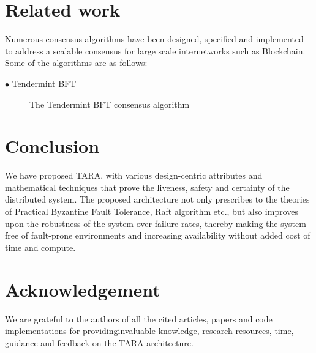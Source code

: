 \documentclass[]{article}
\begin{document}
\section{Related work}
Numerous consensus algorithms have been designed, specified and implemented to address a scalable consensus for large scale internetworks such as Blockchain. Some of the algorithms are as follows:
\begin{description}
	\item[$\bullet$ Tendermint BFT] The Tendermint BFT consensus algorithm
\end{description}

\section{Conclusion}
We have proposed TARA, with various design-centric attributes and mathematical techniques that prove the liveness, safety and certainty of the distributed system. The proposed architecture not only prescribes to the theories of Practical Byzantine Fault Tolerance, Raft algorithm etc., but also improves upon the robustness of the system over failure rates, thereby making the system free of fault-prone environments and increasing availability without added cost of time and compute.

\section{Acknowledgement}
We are grateful to the authors of all the cited articles, papers and code implementations for providinginvaluable knowledge, research resources, time, guidance and feedback on the TARA architecture.

 

\end{document}
